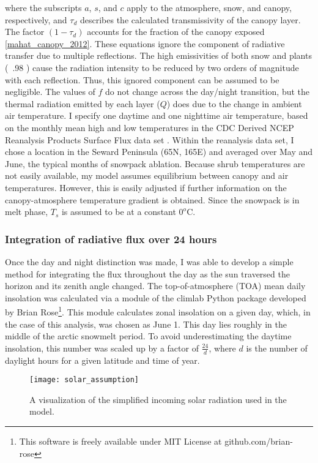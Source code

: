 \documentclass[
10pt, %
letterpaper, %
oneside, %
headinclude,footinclude, %
BCOR5mm, %
]{scrartcl}
\begin{document}
where the subscripts $a$, $s$, and $c$ apply to the atmosphere, snow, and canopy, respectively, and $\tau_d$ describes the calculated transmissivity of the canopy layer. The factor $(1-\tau_d)$ accounts for the fraction of the canopy exposed \ref{mahat_canopy_2012}. These equations ignore the component of radiative transfer due to multiple reflections. The high emissivities of both snow and plants (~.98 \cite{bonan_biophysical_1991}) cause the radiation intensity to be reduced by two orders of magnitude with each reflection. Thus, this ignored component can be assumed to be negligible. The values of $f$ do not change across the day/night transition, but the thermal radiation emitted by each layer ($Q$) does due to the change in ambient air temperature. I specify one daytime and one nighttime air temperature, based on the monthly mean high and low temperatures in the CDC Derived NCEP Reanalysis Products Surface Flux data set \cite{us_department_of_commerce_esrl_????}. Within the reanalysis data set, I chose a location in the Seward Peninsula (65N, 165E) and averaged over May and June, the typical months of snowpack ablation. Because shrub temperatures are not easily available, my model assumes equilibrium between canopy and air temperatures. However, this is easily adjusted if further information on the canopy-atmosphere temperature gradient is obtained. Since the snowpack is in melt phase, $T_s$ is assumed to be at a constant $0^o$C.

\subsubsection{Integration of radiative flux over 24 hours} \label{integ}
Once the day and night distinction was made, I was able to develop a simple method for integrating the flux throughout the day as the sun traversed the horizon and its zenith angle changed. The top-of-atmosphere (TOA) mean daily insolation was calculated via a module of the climlab Python package developed by Brian Rose\footnote{This software is freely available under MIT License at github.com/brian-rose}. This module calculates zonal insolation on a given day, which, in the case of this analysis, was chosen as June 1. This day lies roughly in the middle of the arctic snowmelt period. To avoid underestimating the daytime insolation, this number was scaled up by a factor of $\frac{24}{d}$, where $d$ is the number of daylight hours for a given latitude and time of year.

\begin{figure}
\centering 
\texttt{[image: solar\_assumption]} 
\caption{A visualization of the simplified incoming solar radiation used in the model.}%
\label{fig:solar} 
\end{figure}
\end{document}
